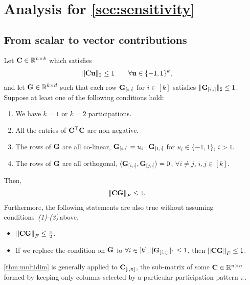 \newcommand{\hdeltaset}{\widehat{\deltaset}}
\newcommand{\hbfG}{\hat{\bfG}}
\newcommand{\kk}{{k \times k}}
\section{Analysis for \cref{sec:sensitivity}}
\label{sec:startofproofs}

\newcommand{\Gsq}{\bfG_{\sf sq}}
\renewcommand{\g}[2]{g\idx{#1}{#2}}
\newcommand{\cond}{\emph{(1)-(3)}\,}
\subsection{From scalar to vector contributions}
\begin{thm}\label{thm:multidim}
Let $\mathbf{C} \in \mathbb{R}^{n \times k}$ which satisfies 
\[
\| \mathbf{C} \mathbf{u} \|_2 \le 1 \qquad \forall \mathbf{u} \in \{ -1, 1\}^k,
\]
and let $\mathbf{G} \in \mathbb{R}^{k \times d}$ such that each row $\mathbf{G}_{[i, :]}$ for $i \in [k]$ satisfies $\|\mathbf{G}_{[i, :]}\|_2 \le 1$. Suppose at least one of the following conditions hold:
\begin{enumerate}
    \item We have $k = 1$ or $k = 2$ participations.
    \item All the entries of $\mathbf{C}^\top\mathbf{C}$ are non-negative.
    \item The rows of $\mathbf{G}$ are all co-linear, $\mathbf{G}_{[i,:]} = u_i\cdot  \mathbf{G}_{[1,:]}$ for $u_i \in \{-1, 1\}$, $i > 1$.
    \item The rows of $\mathbf{G}$ are all orthogonal, $\langle \mathbf{G}_{[i,:]}, \mathbf{G}_{[j,:]}\rangle = 0$, $\forall i \neq j$, $i, j \in [k]$.
\end{enumerate}
Then,
\begin{equation}
\left\| \mathbf{C} \mathbf{G} \right\|_F \le 1.
\label{eq:th143}
\end{equation}
Furthermore, the following statements are also true without assuming conditions~\cond above.
\begin{itemize}
    \item $\left\| \mathbf{C} \mathbf{G} \right\|_F \leq \frac{\pi}{2}$.
    \item If we replace the condition on $\mathbf{G}$ to $\forall i \in [k], \|\mathbf{G}_{[i, :]}\|_1 \le 1$, then $\left\|\mathbf{C} \mathbf{G} \right\|_F \le 1$.
\end{itemize}
\label{thm:901r}
\end{thm}
 \cref{thm:multidim} is generally applied to $\mathbf{C}_{[:, \pi]}$, the sub-matrix of some $\mathbf{C} \in \mathbb{R}^{n \times n}$ formed by keeping only columns selected by a particular participation pattern $\pi$.

